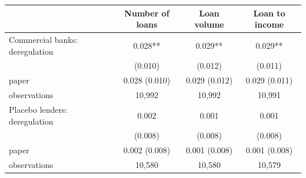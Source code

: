 \begin{tabular}{lccc}
\toprule
 & Number of loans & Loan volume & Loan to income \\
\midrule
Commercial banks: deregulation & 0.028** & 0.029** & 0.029** \\
 & (0.010) & (0.012) & (0.011) \\
\quad paper & 0.028 (0.010) & 0.029 (0.012) & 0.029 (0.011) \\
\quad observations & 10,992 & 10,992 & 10,991 \\
Placebo lenders: deregulation & 0.002 & 0.001 & 0.001 \\
 & (0.008) & (0.008) & (0.008) \\
\quad paper & 0.002 (0.008) & 0.001 (0.008) & 0.001 (0.008) \\
\quad observations & 10,580 & 10,580 & 10,579 \\
\bottomrule
\end{tabular}